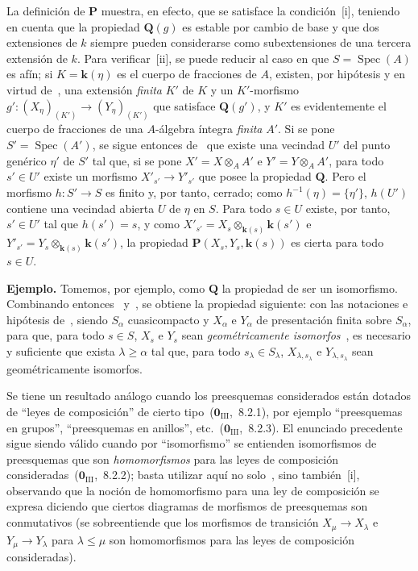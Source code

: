 La definición de $\boldsymbol{P}$ muestra, en efecto, que se satisface la condición~[i], teniendo en cuenta que la propiedad $\boldsymbol{Q}(g)$ es estable por cambio de base y que dos extensiones de $k$ siempre pueden considerarse como subextensiones de una tercera extensión de $k$.
Para verificar~[ii], se puede reducir al caso en que $S=\operatorname{Spec}(A)$ es afín; si $K=\boldsymbol{k}(\eta)$ es el cuerpo de fracciones de $A$, existen, por hipótesis y en virtud de~, una extensión \emph{finita} $K'$ de $K$ y un $K'$-morfismo $g':(X_\eta)_{(K')}\to(Y_\eta)_{(K')}$ que satisface $\boldsymbol{Q}(g')$, y $K'$ es evidentemente el cuerpo de fracciones de una $A$-álgebra íntegra \emph{finita} $A'$.
Si se pone $S'=\operatorname{Spec}(A')$, se sigue entonces de~ que existe una vecindad $U'$ del punto genérico $\eta'$ de $S'$ tal que, si se pone $X'=X\otimes_A A'$ e $Y'=Y\otimes_A A'$, para todo $s'\in U'$ existe un morfismo $X'_{s'}\to Y'_{s'}$ que posee la propiedad $\boldsymbol{Q}$.
Pero el morfismo $h:S'\to S$ es finito y, por tanto, cerrado; como $h^{-1}(\eta)=\{\eta'\}$, $h(U')$ contiene una vecindad abierta $U$ de $\eta$ en $S$.
Para todo $s\in U$ existe, por tanto, $s'\in U'$ tal que $h(s')=s$, y como $X'_{s'}=X_s\otimes_{\mathbf{k}(s)}\boldsymbol{k}(s')$ e $Y'_{s'}=Y_s\otimes_{\mathbf{k}(s)}\boldsymbol{k}(s')$, la propiedad $\boldsymbol{P}(X_s,Y_s,\boldsymbol{k}(s))$ es cierta para todo $s\in U$.

\begin{env}[9.3.6]
\label{IV.9.3.6}
\textbf{Ejemplo.}
Tomemos, por ejemplo, como $\boldsymbol{Q}$ la propiedad de ser un isomorfismo.
Combinando entonces~ y~, se obtiene la propiedad siguiente: con las notaciones e hipótesis de~, siendo $S_\alpha$ cuasicompacto y $X_\alpha$ e $Y_\alpha$ de presentación finita sobre $S_\alpha$, para que, para todo $s\in S$, $X_s$ e $Y_s$ sean \emph{geométricamente isomorfos}~, es necesario y suficiente que exista $\lambda\geqslant\alpha$ tal que, para todo $s_\lambda\in S_\lambda$, $X_{\lambda,s_\lambda}$ e $Y_{\lambda,s_\lambda}$ sean geométricamente isomorfos.
\end{env}

Se tiene un resultado análogo cuando los preesquemas considerados están dotados de ``leyes de composición'' de cierto tipo~($\mathbf{0}_{\mathrm{III}}$,~8.2.1), por ejemplo ``preesquemas en grupos'', ``preesquemas en anillos'', etc.~($\mathbf{0}_{\mathrm{III}}$,~8.2.3).
El enunciado precedente sigue siendo válido cuando por ``isomorfismo'' se entienden isomorfismos de preesquemas que son \emph{homomorfismos} para las leyes de composición consideradas~($\mathbf{0}_{\mathrm{III}}$,~8.2.2); basta utilizar aquí no solo~, sino también~[i], observando que la noción de homomorfismo para una ley de composición se expresa diciendo que ciertos diagramas de morfismos de preesquemas son conmutativos (se sobreentiende que los morfismos de transición $X_\mu\to X_\lambda$ e $Y_\mu\to Y_\lambda$ para $\lambda\leqslant\mu$ son homomorfismos para las leyes de composición consideradas).

